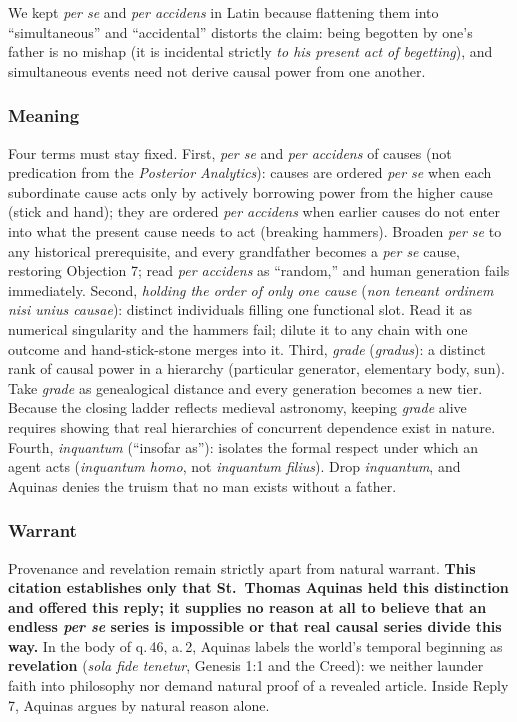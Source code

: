 We kept \emph{per se} and \emph{per accidens} in Latin because flattening them into ``simultaneous'' and ``accidental'' distorts the claim: being begotten by one's father is no mishap (it is incidental strictly \emph{to his present act of begetting}), and simultaneous events need not derive causal power from one another.

\subsubsection*{Meaning}

Four terms must stay fixed. First, \emph{per se} and \emph{per accidens} of causes (not predication from the \emph{Posterior Analytics}): causes are ordered \emph{per se} when each subordinate cause acts only by actively borrowing power from the higher cause (stick and hand); they are ordered \emph{per accidens} when earlier causes do not enter into what the present cause needs to act (breaking hammers). Broaden \emph{per se} to any historical prerequisite, and every grandfather becomes a \emph{per se} cause, restoring Objection 7; read \emph{per accidens} as ``random,'' and human generation fails immediately. Second, \emph{holding the order of only one cause} (\emph{non teneant ordinem nisi unius causae}): distinct individuals filling one functional slot. Read it as numerical singularity and the hammers fail; dilute it to any chain with one outcome and hand-stick-stone merges into it. Third, \emph{grade} (\emph{gradus}): a distinct rank of causal power in a hierarchy (particular generator, elementary body, sun). Take \emph{grade} as genealogical distance and every generation becomes a new tier. Because the closing ladder reflects medieval astronomy, keeping \emph{grade} alive requires showing that real hierarchies of concurrent dependence exist in nature. Fourth, \emph{inquantum} (``insofar as''): isolates the formal respect under which an agent acts (\emph{inquantum homo}, not \emph{inquantum filius}). Drop \emph{inquantum}, and Aquinas denies the truism that no man exists without a father.

\subsubsection*{Warrant}

Provenance and revelation remain strictly apart from natural warrant. \textbf{This citation establishes only that St.\ Thomas Aquinas held this distinction and offered this reply; it supplies no reason at all to believe that an endless \emph{per se} series is impossible or that real causal series divide this way.} In the body of q.\,46, a.\,2, Aquinas labels the world's temporal beginning as \textbf{revelation} (\emph{sola fide tenetur}, Genesis 1:1 and the Creed): we neither launder faith into philosophy nor demand natural proof of a revealed article. Inside Reply 7, Aquinas argues by natural reason alone.

